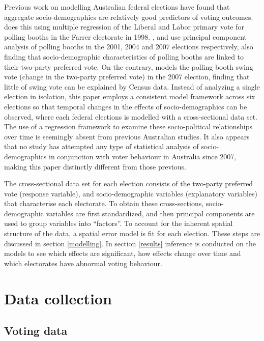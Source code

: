 \documentclass[openany]{book}
\begin{document}
Previous work on modelling Australian federal elections have found that aggregate socio-demographics are relatively good predictors of voting outcomes. \citet{Forrest01} does this using multiple regression of the Liberal and Labor primary vote for polling booths in the Farrer electorate in 1998. \citet{Stimson06}, \citet{Stimson09} and \citet{Stimson12} use principal component analysis of polling booths in the 2001, 2004 and 2007 elections respectively, also finding that socio-demographic characteristics of polling booths are linked to their two-party preferred vote. On the contrary, \citet{Stimson09} models the polling booth swing vote (change in the two-party preferred vote) in the 2007 election, finding that little of swing vote can be explained by Census data. Instead of analyzing a single election in isolation, this paper employs a consistent model framework across six elections so that temporal changes in the effects of socio-demographics can be observed, where each federal elections is modelled with a cross-sectional data set. The use of a regression framework to examine these socio-political relationships over time is seemingly absent from previous Australian studies. It also appears that no study has attempted any type of statistical analysis of socio-demographics in conjunction with voter behaviour in Australia since 2007, making this paper distinctly different from those previous.

The cross-sectional data set for each election consists of the two-party preferred vote (response variable), and socio-demographic variables (explanatory variables) that characterise each electorate. To obtain these cross-sections, socio-demographic variables are first standardized, and then principal components are used to group variables into ``factors''. To account for the inherent spatial structure of the data, a spatial error model is fit for each election. These steps are discussed in section \ref{modelling}. In section \ref{results} inference is conducted on the models to see which effects are significant, how effects change over time and which electorates have abnormal voting behaviour.

\hypertarget{data}{%
\chapter{Data collection}\label{data}}

\hypertarget{voting-data}{%
\section{Voting data}\label{voting-data}}
\end{document}
